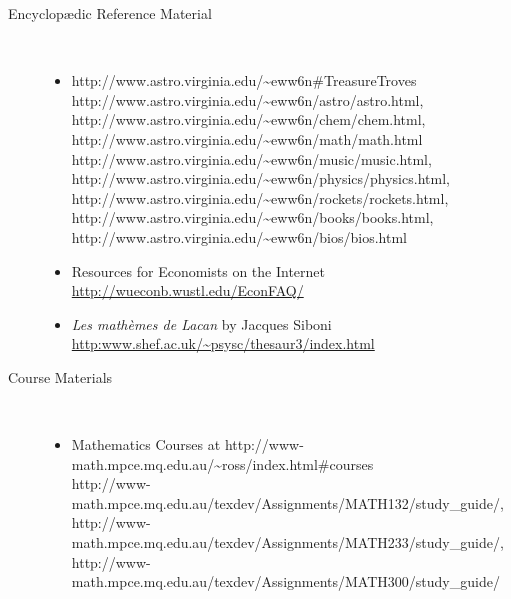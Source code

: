 \begin{description}
\begin{itemize}
%

\end{itemize}


\htmlrule[50\% center]

\item[Encyclop\ae{}dic Reference Material]~%
\begin{itemize}
\item
{}%
{http://www.astro.virginia.edu/\~{}eww6n\#TreasureTroves}
%
{http://www.astro.virginia.edu/\~{}eww6n/astro/astro.html},
%
{http://www.astro.virginia.edu/\~{}eww6n/chem/chem.html},
%
{http://www.astro.virginia.edu/\~{}eww6n/math/math.html}\\
%
{http://www.astro.virginia.edu/\~{}eww6n/music/music.html},
%
{http://www.astro.virginia.edu/\~{}eww6n/physics/physics.html},
%
{http://www.astro.virginia.edu/\~{}eww6n/rockets/rockets.html},
%
{http://www.astro.virginia.edu/\~{}eww6n/books/books.html},
%
{http://www.astro.virginia.edu/\~{}eww6n/bios/bios.html}
\html{\smallskip}

\item
Resources for Economists on the Internet\\
\url{http://wueconb.wustl.edu/EconFAQ/}
\html{\smallskip}

\item
\textit{Les math{\`e}mes de Lacan} by Jacques Siboni\\
\url{http:www.shef.ac.uk/~psysc/thesaur3/index.html}
\html{\smallskip}

\end{itemize}

\htmlrule[50\% center]


\item[Course Materials]~%
\begin{itemize}
\item
Mathematics Courses at %
{http://www-math.mpce.mq.edu.au/\~{}ross/index.html\#courses}\\
%
{http://www-math.mpce.mq.edu.au/texdev/Assignments/MATH132/study_guide/},
%
{http://www-math.mpce.mq.edu.au/texdev/Assignments/MATH233/study_guide/},
%
{http://www-math.mpce.mq.edu.au/texdev/Assignments/MATH300/study_guide/}
\html{\smallskip}


\end{itemize}
\end{description}
